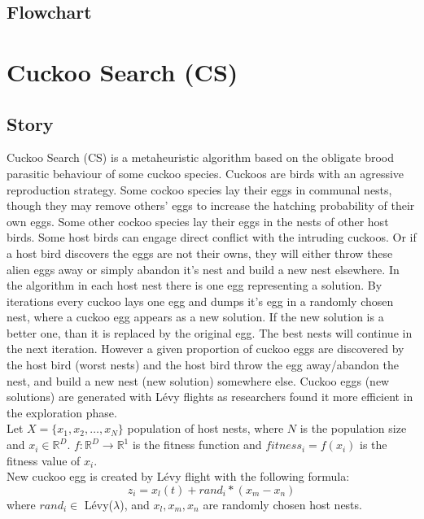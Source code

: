 \documentclass[border=0.2cm]{report}
\newcommand{\R}{\mathbb{R}} %
\begin{document}
\section{Flowchart}

\chapter{Cuckoo Search (CS)}
\section{Story}
Cuckoo Search (CS) \cite{cs1} is a metaheuristic algorithm based on the obligate brood parasitic behaviour of some cuckoo species. Cuckoos are birds with an agressive reproduction strategy.  Some cockoo species lay their eggs in communal nests, though they may remove others’ eggs to increase the hatching probability of their own eggs. Some other cockoo species lay their eggs in the nests of other host birds. Some host birds can engage direct conflict with the intruding cuckoos. Or if a host bird discovers the eggs are not their owns, they will either throw these alien eggs away or simply abandon it's nest and build a new nest elsewhere.
In the algorithm in each host nest there is one egg representing a solution. By iterations every cuckoo lays one egg and dumps it's egg in a randomly chosen nest, where a cuckoo egg appears as a new solution. If the new solution is a better one, than it is replaced by the original egg. The best nests will continue in the next iteration. However a given proportion of cuckoo eggs are discovered by the host bird (worst nests) and the host bird throw the egg away/abandon the nest, and build a new nest (new solution) somewhere else. Cuckoo eggs (new solutions) are generated with Lévy flights as researchers found it more efficient in the exploration phase. \\

\noindent
Let $X=\{x_1,x_2,\ldots,x_N\}$ population of host nests, where $N$ is the population size and $x_i \in \R^D$.
$f: \R^{D}\to\R^1$ is the fitness function and $fitness_i=f(x_i)$ is the fitness value of $x_i$.\\
New cuckoo egg is created by Lévy flight with the following formula:
\begin{equation}\label{eqn_cs_levyflight}
z_i=x_l(t)+rand_i*(x_m-x_n)
\end{equation}
where $rand_i \in$ Lévy($\lambda$), and $x_l, x_m, x_n$ are randomly chosen host nests. \\ 
\end{document}
